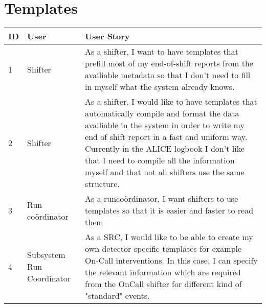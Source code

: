 \documentclass[paper=a4, fontsize=11pt,twoside]{scrartcl}	%
\begin{document}
\section{Templates}
\begin{longtable}{ | p{1cm} | p{5cm} | p{8cm} |}
\hline
ID & User & User Story \\ \hline
1& Shifter & As a shifter, I want to have templates that prefill most of my end-of-shift reports from the availiable metadata so that I don't need to fill in myself what the system already knows. \\ \hline
2 & Shifter & As a shifter, I would like to have templates that automatically compile and format the data availiable in the system in order to write my end of shift report in a fast and uniform way. Currently in the ALICE logbook I don't like that I need to compile all the information myself and that not all shifters use the same structure. \\ \hline
3 & Run co\"ordinator & As a runco\"ordinator, I want shifters to use templates so that it is easier and faster to read them \\ \hline
4 & Subsystem Run Coordinator & As a SRC, I would like to be able to create my own detector specific templates for example On-Call interventions. In this case, I can specify the relevant information which are required from the OnCall shifter for different kind of "standard" events. \\ \hline
\end{longtable}
\end{document}

